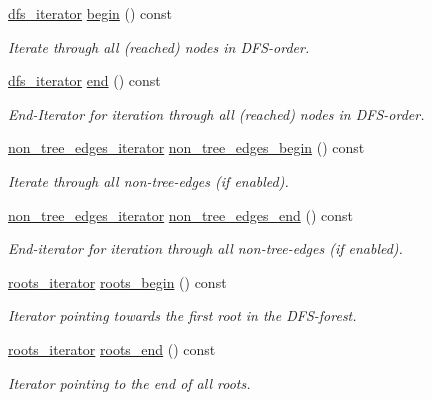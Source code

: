 \begin{DoxyCompactItemize}
\mbox{\hyperlink{classdfs_a15fe023a5a1f7ddda00f3d87110d9a32}{dfs\+\_\+iterator}} \mbox{\hyperlink{classdfs_ab06650dd8cbd5e76b0c73b71458ec5ec}{begin}} () const
\begin{DoxyCompactList}\small\item\em Iterate through all (reached) nodes in D\+F\+S-\/order. \end{DoxyCompactList}\item 
\mbox{\hyperlink{classdfs_a15fe023a5a1f7ddda00f3d87110d9a32}{dfs\+\_\+iterator}} \mbox{\hyperlink{classdfs_af847633fa642258d3522e8deb26aef37}{end}} () const
\begin{DoxyCompactList}\small\item\em End-\/\+Iterator for iteration through all (reached) nodes in D\+F\+S-\/order. \end{DoxyCompactList}\item 
\mbox{\hyperlink{classdfs_a95e353f354d3b31daded0c4fe749171a}{non\+\_\+tree\+\_\+edges\+\_\+iterator}} \mbox{\hyperlink{classdfs_a4efe5bb72d00305e6b226e67c2b2ef6e}{non\+\_\+tree\+\_\+edges\+\_\+begin}} () const
\begin{DoxyCompactList}\small\item\em Iterate through all non-\/tree-\/edges (if enabled). \end{DoxyCompactList}\item 
\mbox{\hyperlink{classdfs_a95e353f354d3b31daded0c4fe749171a}{non\+\_\+tree\+\_\+edges\+\_\+iterator}} \mbox{\hyperlink{classdfs_ad9cd92a18bda23edca8ab3ac60a15ef4}{non\+\_\+tree\+\_\+edges\+\_\+end}} () const
\begin{DoxyCompactList}\small\item\em End-\/iterator for iteration through all non-\/tree-\/edges (if enabled). \end{DoxyCompactList}\item 
\mbox{\hyperlink{classdfs_a1ea6e8eb2766ac95ac48a8523359065a}{roots\+\_\+iterator}} \mbox{\hyperlink{classdfs_af56fa2b736f0b924dba1257e18ba4b61}{roots\+\_\+begin}} () const
\begin{DoxyCompactList}\small\item\em Iterator pointing towards the first root in the D\+F\+S-\/forest. \end{DoxyCompactList}\item 
\mbox{\hyperlink{classdfs_a1ea6e8eb2766ac95ac48a8523359065a}{roots\+\_\+iterator}} \mbox{\hyperlink{classdfs_ae1a61d8c2d8d99059cab410f766ec73f}{roots\+\_\+end}} () const
\begin{DoxyCompactList}\small\item\em Iterator pointing to the end of all roots. \end{DoxyCompactList}\item 

\end{DoxyCompactItemize}
